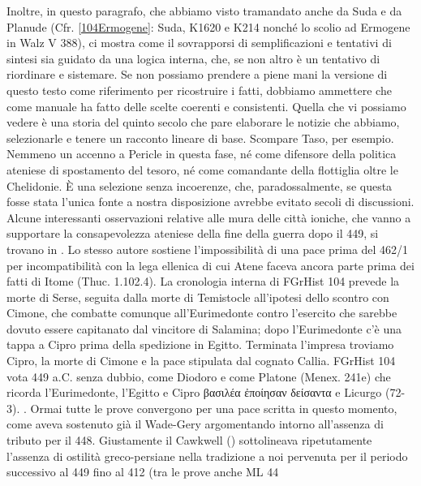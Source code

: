 {Inoltre, in questo paragrafo, che abbiamo visto tramandato anche da Suda e da Planude (Cfr. \ref{104Ermogene}: Suda, K1620 e K214 nonché lo scolio ad Ermogene in Walz V 388), ci mostra come il sovrapporsi di semplificazioni e tentativi di sintesi sia guidato da una logica interna, che, se non altro è un tentativo di riordinare e sistemare. Se non possiamo prendere a piene mani la versione di questo testo come riferimento per ricostruire i fatti, dobbiamo ammettere che come manuale ha fatto delle scelte coerenti e consistenti. Quella che vi possiamo vedere è una storia del quinto secolo che pare elaborare le notizie che abbiamo, selezionarle e tenere un racconto lineare di base. Scompare Taso, per esempio. Nemmeno un accenno a Pericle  in questa fase, né come difensore della politica ateniese di spostamento del tesoro, né come comandante della flottiglia oltre le Chelidonie. È una selezione senza incoerenze, che, paradossalmente, se questa fosse stata l'unica fonte a nostra disposizione avrebbe evitato secoli di discussioni. Alcune interessanti osservazioni relative alle mura delle città ioniche, che vanno a supportare la consapevolezza ateniese della fine della guerra dopo il 449, si trovano in \cite[121s]{Cawkwell1997}. Lo stesso autore sostiene l'impossibilità di una pace prima del 462/1 per incompatibilità con la lega ellenica di cui Atene faceva ancora parte prima dei fatti di Itome (Thuc. 1.102.4).  La cronologia interna di FGrHist 104 prevede la morte di Serse, seguita dalla morte di Temistocle all'ipotesi dello scontro con Cimone, che combatte comunque all'Eurimedonte contro l'esercito che sarebbe dovuto essere capitanato dal vincitore di Salamina; dopo l'Eurimedonte c'è una tappa a Cipro prima della spedizione in Egitto. Terminata l'impresa troviamo Cipro, la morte di  Cimone e la pace stipulata dal cognato Callia. FGrHist 104 vota 449 a.C. senza dubbio, come  Diodoro e come Platone (Menex. 241e) che ricorda l'Eurimedonte, l'Egitto e Cipro \textgreek{βασιλέα ἐποίησαν δείσαντα} e Licurgo  (72-3). \cite[1]{Badian1987}.  Ormai tutte le prove convergono per una pace scritta in questo momento, come aveva sostenuto già il Wade-Gery argomentando intorno all'assenza di tributo per il 448. Giustamente il Cawkwell (\cite*[115]{Cawkwell1997}) sottolineava ripetutamente l'assenza di ostilità greco-persiane nella tradizione a noi pervenuta per il periodo successivo al 449 fino al 412 (tra le prove anche ML 44 
}
